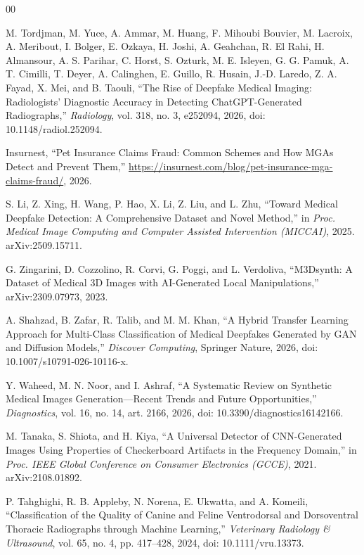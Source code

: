 \documentclass[journal]{IEEEtran}
\begin{document}
\begin{thebibliography}{00}

M. Tordjman, M. Yuce, A. Ammar, M. Huang, F. Mihoubi Bouvier, M. Lacroix,
A. Meribout, I. Bolger, E. Ozkaya, H. Joshi, A. Geahchan, R. El Rahi,
H. Almansour, A. S. Parihar, C. Horst, S. Ozturk, M. E. Isleyen, G. G. Pamuk,
A. T. Cimilli, T. Deyer, A. Calinghen, E. Guillo, R. Husain, J.-D. Laredo,
Z. A. Fayad, X. Mei, and B. Taouli,
``The Rise of Deepfake Medical Imaging: Radiologists' Diagnostic Accuracy in
Detecting ChatGPT-Generated Radiographs,''
\textit{Radiology}, vol. 318, no. 3, e252094, 2026,
doi: 10.1148/radiol.252094.

Insurnest, ``Pet Insurance Claims Fraud: Common Schemes and How MGAs Detect and Prevent Them,''
\url{https://insurnest.com/blog/pet-insurance-mga-claims-fraud/}, 2026.

S. Li, Z. Xing, H. Wang, P. Hao, X. Li, Z. Liu, and L. Zhu,
``Toward Medical Deepfake Detection: A Comprehensive Dataset and Novel Method,''
in \textit{Proc. Medical Image Computing and Computer Assisted Intervention (MICCAI)}, 2025.
arXiv:2509.15711.

G. Zingarini, D. Cozzolino, R. Corvi, G. Poggi, and L. Verdoliva,
``M3Dsynth: A Dataset of Medical 3D Images with AI-Generated Local Manipulations,''
arXiv:2309.07973, 2023.

A. Shahzad, B. Zafar, R. Talib, and M. M. Khan,
``A Hybrid Transfer Learning Approach for Multi-Class Classification of Medical Deepfakes Generated by GAN and Diffusion Models,''
\textit{Discover Computing}, Springer Nature, 2026,
doi: 10.1007/s10791-026-10116-x.

Y. Waheed, M. N. Noor, and I. Ashraf,
``A Systematic Review on Synthetic Medical Images Generation—Recent Trends and Future Opportunities,''
\textit{Diagnostics}, vol. 16, no. 14, art. 2166, 2026,
doi: 10.3390/diagnostics16142166.

M. Tanaka, S. Shiota, and H. Kiya,
``A Universal Detector of CNN-Generated Images Using Properties of Checkerboard Artifacts in the Frequency Domain,''
in \textit{Proc. IEEE Global Conference on Consumer Electronics (GCCE)}, 2021.
arXiv:2108.01892.

P. Tahghighi, R. B. Appleby, N. Norena, E. Ukwatta, and A. Komeili,
``Classification of the Quality of Canine and Feline Ventrodorsal and Dorsoventral Thoracic Radiographs through Machine Learning,''
\textit{Veterinary Radiology \& Ultrasound}, vol. 65, no. 4, pp. 417--428, 2024,
doi: 10.1111/vru.13373.


\end{thebibliography}
\end{document}
